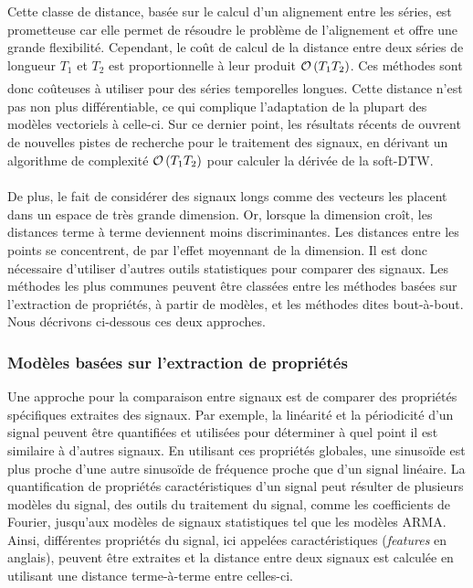 \documentclass[../thesis.tex]{subfiles}
\begin{document}
	Cette classe de distance, basée sur le calcul d'un alignement entre les séries, est prometteuse
	car elle permet de résoudre le problème de l'alignement et offre une grande flexibilité.
	Cependant, le coût de calcul de la distance entre deux séries de longueur $T_1$ et $T_2$
	est proportionnelle à leur produit $\underset{}{\mathcal O}\left(T_1T_2\right)$. Ces méthodes sont donc coûteuses
	à utiliser pour des séries temporelles longues. Cette distance n'est pas non plus
	différentiable, ce qui complique l'adaptation de la plupart des modèles vectoriels à
	celle-ci. Sur ce dernier point, les résultats récents de \citet{Cuturi2017} ouvrent
	de nouvelles pistes de recherche pour le traitement des signaux, en dérivant un algorithme
	de complexité $\underset{}{\mathcal O}\left(T_1T_2\right)$ pour calculer la dérivée de la soft-DTW.


	De plus, le fait de considérer des signaux longs comme des vecteurs les placent dans un espace
	de très grande dimension. Or, lorsque la dimension croît, les distances terme à terme deviennent
	moins discriminantes. Les distances entre les points se concentrent, de par l'effet moyennant
	de la dimension. Il est donc nécessaire d'utiliser d'autres outils statistiques pour comparer
	des signaux. Les méthodes les plus communes peuvent être classées entre les méthodes basées
	sur l'extraction de propriétés, à partir de modèles, et les méthodes dites bout-à-bout. Nous
	décrivons ci-dessous ces deux approches.


\subsubsection{Modèles basées sur l'extraction de propriétés}
\label{ssub:french:feat_comp}


	Une approche pour la comparaison entre signaux est de comparer des
	propriétés spécifiques extraites des signaux. Par exemple, la linéarité et la
	périodicité d'un signal peuvent être quantifiées et utilisées pour déterminer à
	quel point il est similaire à d'autres signaux. En utilisant ces propriétés globales,
	une sinusoïde est plus proche d'une autre sinusoïde de fréquence proche que d'un
	signal linéaire. La quantification de propriétés caractéristiques d'un signal peut
	résulter de plusieurs modèles du signal, des outils du traitement du signal, comme
	les coefficients de Fourier, jusqu'aux modèles de signaux statistiques tel que les
	modèles ARMA. Ainsi, différentes propriétés du signal, ici appelées caractéristiques
	(\emph{features} en anglais), peuvent être extraites et la distance entre deux
	signaux est calculée en utilisant une distance terme-à-terme entre celles-ci.
\end{document}
